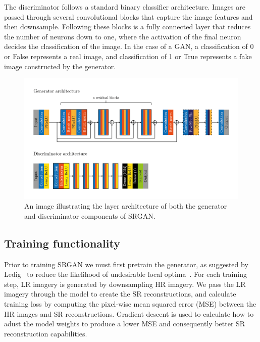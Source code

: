 The discriminator follows a standard binary classifier architecture. Images are passed through several convolutional blocks that capture the image features and then downsample. Following these blocks is a fully connected layer that reduces the number of neurons down to one, where the activation of the final neuron decides the classification of the image. In the case of a GAN, a classification of 0 or False represents a real image, and classification of 1 or True represents a fake image constructed by the generator. 

\begin{figure}
    \includegraphics[width=\linewidth]{./assets/srgan_architecture.png}
    \caption{An image illustrating the layer architecture of both the generator and discriminator components of SRGAN.}\label{fig:srgan_architecture}
\end{figure}

\subsection{Training functionality}\label{subsec:training_functionality}
Prior to training SRGAN we must first pretrain the generator, as suggested by Ledig \etal\ to reduce the likelihood of undesirable local optima~\cite{srgan}. For each training step, LR imagery is generated by downsampling HR imagery. We pass the LR imagery through the model to create the SR reconstructions, and calculate training loss by computing the pixel-wise mean squared error (MSE) between the HR images and SR reconstructions. Gradient descent is used to calculate how to adust the model weights to produce a lower MSE and consequently better SR reconstruction capabilities.

